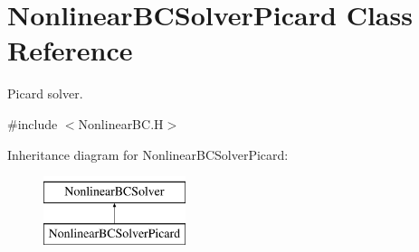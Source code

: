 \hypertarget{class_nonlinear_b_c_solver_picard}{}\section{Nonlinear\+B\+C\+Solver\+Picard Class Reference}
\label{class_nonlinear_b_c_solver_picard}


Picard solver.  




{\ttfamily \#include $<$Nonlinear\+B\+C.\+H$>$}

Inheritance diagram for Nonlinear\+B\+C\+Solver\+Picard\+:\begin{figure}[H]
\begin{center}
\leavevmode
\includegraphics[height=2.000000cm]{class_nonlinear_b_c_solver_picard}
\end{center}
\end{figure}
